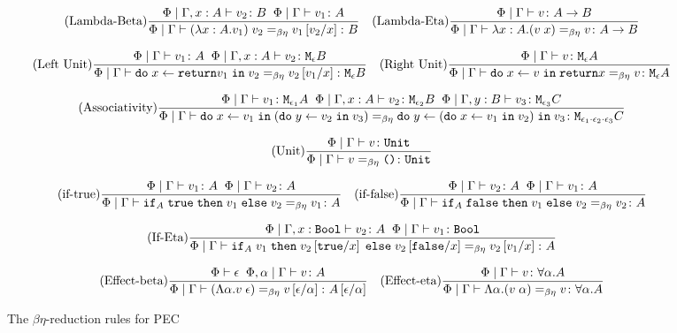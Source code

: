 \documentclass{Report}
\begin{document}
\begin{figure}[h!]\label{BetaEtaReductions}
    \[
        \treerule{Lambda-Beta}{\etyperelation{\P}{\gax}{v_2}{B}\s\s \gpetyperelation{v_1}{A}}{\gpeberelation{\apply{(\lam{x}{A}{v_1})}{v_2} }{ v_1\ssub{x}{v_2}}{B}}
        \quad
        \treerule{Lambda-Eta}{\gpetyperelation{v}{\ab}}{\gpeberelation{\lam{x}{A}{(\apply{v}{x}})}{v}{\ab}}
    \]

    \[
        \treerule{Left Unit}{\gpetyperelation{v_1}{A} \s\s \etyperelation{\P}{\gax}{v_2}{\meb}}{\gpeberelation{\doin{x}{\return{v_1}}{v_2}}{v_2\ssub{x}{v_1}}{\meb}}
        \quad
        \treerule{Right Unit}{\gpetyperelation{v}{\mea}}{\gpeberelation{\doin{x}{v}{\return{x}} }{v}{\mea}}
    \]

    \[
        \treerule{Associativity}{\gpetyperelation{v_1}{\M{\e_1}{A}} \s\s \etyperelation{\P}{\gax}{v_2}{\M{\e_2}{B}}\s\s \etyperelation{\P}{\gby}{v_3}{\M{\e_3}{C}}}{
            \gpeberelation{\doin{x}{v_1}{(\doin{y}{v_2}{v_3})}}{\doin{y}{(\doin{x}{v_1}{v_2})}{v_3}}{\M{\e_1 \dot \e_2 \dot \e_3}{C}}
        }
    \]

    \[
        \treerule{Unit}{\gpetyperelation{v}{\U}}{\gpeberelation{v}{\u}{\U}}
    \]

    \[
        \treerule{if-true}{\gpetyperelation{v_1}{A}\s\s\gpetyperelation{v_2}{A}}{\gpeberelation{\pifthenelse{A}{\t}{v_1}{v_2}}{v_1}{A}}
        \quad
        \treerule{if-false}{\gpetyperelation{v_2}{A}\s\s\gpetyperelation{v_1}{A}}{\gpeberelation{\pifthenelse{A}{\f}{v_1}{v_2}}{v_2}{A}}    
    \]

    \[
        \treerule{If-Eta}{\etyperelation{\P}{\G, x: \B}{v_2}{A}\s\s\gpetyperelation{v_1}{\B}}{\gpeberelation{\pifthenelse{A}{v_1}{v_2\ssub{x}{\t}}{v_2\ssub{x}{\f}}}{v_2\ssub{x}{v_1}}{A}}
    \]

    \[
        \treerule{Effect-beta}{\wellformed{\P}{\e}\s\s\etyperelation{\P, \a}{\G}{v}{A}}{\gpeberelation{\eapp{(\elam{\a}{v}}{\e})}{v\ssub{\a}{\e}}{A\ssub{\a}{\e}}}
        \quad 
        \treerule{Effect-eta}{\etyperelation{\P}{\G}{v}{\all{\a}{A}}}{\gpeberelation{\elam{\a}{(\eapp{v}{\a})}}{v}{\all{\a}{A}}}
    \]
    \caption{The $\beta\eta$-reduction rules for PEC}
\end{figure}
\end{document}
